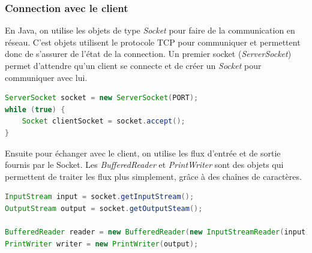 \documentclass[a4paper, 12pt]{report}
\begin{document}
		\subsubsection{Connection avec le client}
			En Java, on utilise les objets de type \emph{Socket} pour faire de la communication en réseau. C'est objets utilisent le protocole TCP pour communiquer et permettent donc de s'assurer de l'état de la connection.
			Un premier socket (\emph{ServerSocket}) permet d'attendre qu'un client se connecte et de créer un \emph{Socket} pour communiquer avec lui.
			\begin{mdframed}[backgroundcolor=light-gray, roundcorner=20pt,
				leftmargin=0, rightmargin=0, 
				innerleftmargin=20, linecolor=darkgray]
				\begin{lstlisting}[language=Java]
ServerSocket socket = new ServerSocket(PORT);
while (true) {
	Socket clientSocket = socket.accept();
}
				\end{lstlisting}
			\end{mdframed}
			Ensuite pour échanger avec le client, on utilise les flux d'entrée et de sortie fournis par le Socket.
			Les \emph{BufferedReader} et \emph{PrintWriter} sont des objets qui permettent de traiter les flux plus simplement, grâce à des chaînes de caractères.
			\begin{mdframed}[backgroundcolor=light-gray, roundcorner=20pt,
				innerleftmargin=20, linecolor=darkgray]
				\begin{lstlisting}[language=Java]
InputStream input = socket.getInputStream();
OutputStream output = socket.getOutputSteam();

BufferedReader reader = new BufferedReader(new InputStreamReader(input));
PrintWriter writer = new PrintWriter(output);
				\end{lstlisting}
			\end{mdframed}
\end{document}
